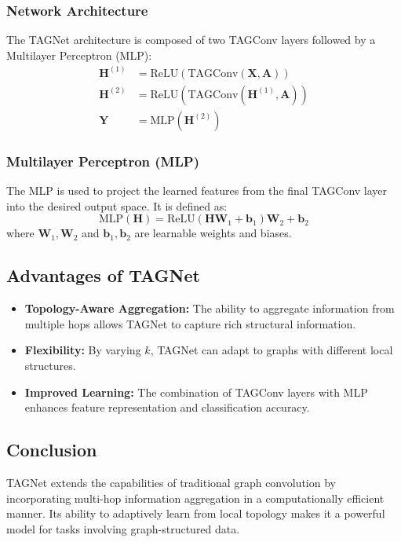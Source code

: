 	\subsubsection*{Network Architecture}
	The TAGNet architecture is composed of two TAGConv layers followed by a Multilayer Perceptron (MLP):
	\begin{align*}
		\mathbf{H}^{(1)} &= \text{ReLU}(\text{TAGConv}(\mathbf{X}, \mathbf{A})) \\
		\mathbf{H}^{(2)} &= \text{ReLU}(\text{TAGConv}(\mathbf{H}^{(1)}, \mathbf{A})) \\
		\mathbf{Y} &= \text{MLP}(\mathbf{H}^{(2)})
	\end{align*}
	
	\subsubsection*{Multilayer Perceptron (MLP)}
	The MLP is used to project the learned features from the final TAGConv layer into the desired output space. It is defined as:
	\[
	\text{MLP}(\mathbf{H}) = \text{ReLU}(\mathbf{H} \mathbf{W}_1 + \mathbf{b}_1) \mathbf{W}_2 + \mathbf{b}_2
	\]
	where \( \mathbf{W}_1, \mathbf{W}_2 \) and \( \mathbf{b}_1, \mathbf{b}_2 \) are learnable weights and biases.
	
	\subsection*{Advantages of TAGNet}
	\begin{itemize}
		\item \textbf{Topology-Aware Aggregation:} The ability to aggregate information from multiple hops allows TAGNet to capture rich structural information.
		\item \textbf{Flexibility:} By varying \( k \), TAGNet can adapt to graphs with different local structures.
		\item \textbf{Improved Learning:} The combination of TAGConv layers with MLP enhances feature representation and classification accuracy.
	\end{itemize}
	
	\subsection*{Conclusion}
	TAGNet extends the capabilities of traditional graph convolution by incorporating multi-hop information aggregation in a computationally efficient manner. Its ability to adaptively learn from local topology makes it a powerful model for tasks involving graph-structured data.



